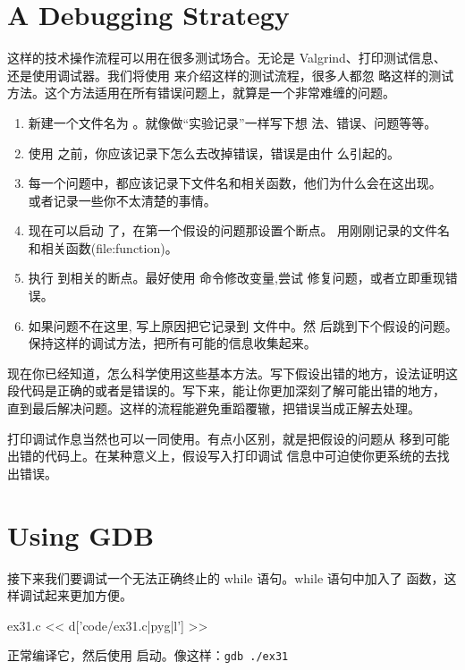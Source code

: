 \begin{enumerate}
\section{A Debugging Strategy}

这样的技术操作流程可以用在很多测试场合。无论是 Valgrind、打印测试信息、
还是使用调试器。我们将使用  来介绍这样的测试流程，很多人都忽
略这样的测试方法。这个方法适用在所有错误问题上，就算是一个非常难缠的问题。

\begin{enumerate}
\item 新建一个文件名为 。就像做“实验记录”一样写下想
  法、错误、问题等等。
\item 使用  之前，你应该记录下怎么去改掉错误，错误是由什
  么引起的。
\item 每一个问题中，都应该记录下文件名和相关函数，他们为什么会在这出现。
  或者记录一些你不太清楚的事情。
\item 现在可以启动  了，在第一个假设的问题那设置个断点。
  用刚刚记录的文件名和相关函数(file:function)。
\item 执行  到相关的断点。最好使用  命令修改变量,尝试
  修复问题，或者立即重现错误。
\item 如果问题不在这里, 写上原因把它记录到  文件中。然
  后跳到下个假设的问题。保持这样的调试方法，把所有可能的信息收集起来。
\end{enumerate}


现在你已经知道，怎么科学使用这些基本方法。写下假设出错的地方，设法证明这
段代码是正确的或者是错误的。写下来，能让你更加深刻了解可能出错的地方，
直到最后解决问题。这样的流程能避免重蹈覆辙，把错误当成正解去处理。

打印调试作息当然也可以一同使用。有点小区别，就是把假设的问题从
 移到可能出错的代码上。在某种意义上，假设写入打印调试
信息中可迫使你更系统的去找出错误。


\section{Using GDB}

接下来我们要调试一个无法正确终止的 while 语句。while 语句中加入了
 函数，这样调试起来更加方便。

\begin{code}{ex31.c}
<< d['code/ex31.c|pyg|l'] >>
\end{code}

正常编译它，然后使用  启动。像这样：\verb|gdb ./ex31|


\end{enumerate}
